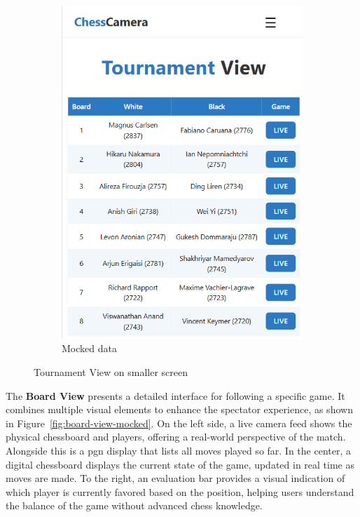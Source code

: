 \begin{figure}[h!]
\begin{subfigure}[h!]{0.4\linewidth}
        \includegraphics[width=\linewidth]{figures/results/frontend/tournament-view/mocked-mobile.png}
        \caption{Mocked data}
        \label{fig:small-tournament-view}
    \end{subfigure}
    \caption{Tournament View on smaller screen}
    \label{fig:small-view-tournament-view-group}
\end{figure}

The \textbf{Board View} presents a detailed interface for following a specific game. It combines multiple visual elements to enhance the spectator experience, as shown in Figure~\ref{fig:board-view-mocked}. On the left side, a live camera feed shows the physical chessboard and players, offering a real-world perspective of the match. Alongside this is a \gls{pgn} display that lists all moves played so far. In the center, a digital chessboard displays the current state of the game, updated in real time as moves are made. To the right, an evaluation bar provides a visual indication of which player is currently favored based on the position, helping users understand the balance of the game without advanced chess knowledge. \\

